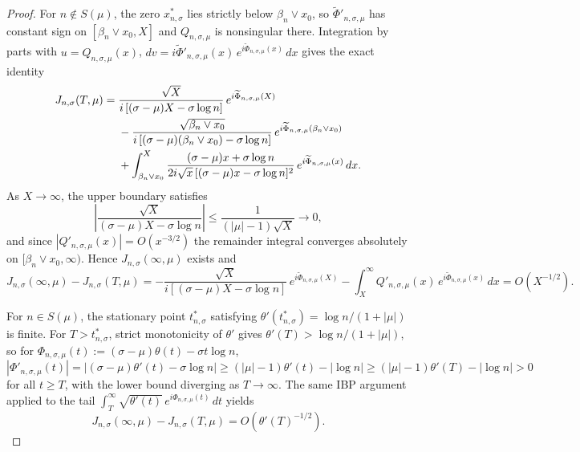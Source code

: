 \documentclass[12pt]{article}
\begin{document}
\begin{proof}
For $n\notin S(\mu)$, the zero $x^{*}_{n,\sigma}$ lies strictly below $\beta_n\vee x_0$, so $\widetilde{\Phi}'_{n,\sigma,\mu}$ has constant sign on $[\beta_n\vee x_0,X]$ and $Q_{n,\sigma,\mu}$ is nonsingular there. Integration by parts with $u=Q_{n,\sigma,\mu}(x)$, $dv=i\widetilde{\Phi}'_{n,\sigma,\mu}(x)\,e^{i\widetilde{\Phi}_{n,\sigma,\mu}(x)}\,dx$ gives the exact identity
\begin{align}
J_{n,\sigma}(T,\mu) =\;& \frac{\sqrt{X}}{i\,[(\sigma-\mu)X-\sigma\log n]}\,e^{i\widetilde{\Phi}_{n,\sigma,\mu}(X)} \notag\\
&-\frac{\sqrt{\beta_n\vee x_0}}{i\,[(\sigma-\mu)(\beta_n\vee x_0)-\sigma\log n]}\,e^{i\widetilde{\Phi}_{n,\sigma,\mu}(\beta_n\vee x_0)} \notag\\
&+\int_{\beta_n\vee x_0}^{X}\frac{(\sigma-\mu)x+\sigma\log n}{2i\sqrt{x}\,[(\sigma-\mu)x-\sigma\log n]^{2}}\,e^{i\widetilde{\Phi}_{n,\sigma,\mu}(x)}\,dx.
\end{align}
As $X\to\infty$, the upper boundary satisfies
\begin{equation}
\left|\frac{\sqrt{X}}{(\sigma-\mu)X-\sigma\log n}\right| \le \frac{1}{(|\mu|-1)\sqrt{X}} \longrightarrow 0,
\end{equation}
and since $|Q'_{n,\sigma,\mu}(x)|=O(x^{-3/2})$ the remainder integral converges absolutely on $[\beta_n\vee x_0,\infty)$. Hence $J_{n,\sigma}(\infty,\mu)$ exists and
\begin{equation}\label{eq:tail-out}
J_{n,\sigma}(\infty,\mu)-J_{n,\sigma}(T,\mu) = -\frac{\sqrt{X}}{i[(\sigma-\mu)X-\sigma\log n]}\,e^{i\widetilde{\Phi}_{n,\sigma,\mu}(X)} - \int_{X}^{\infty}Q'_{n,\sigma,\mu}(x)\,e^{i\widetilde{\Phi}_{n,\sigma,\mu}(x)}\,dx = O(X^{-1/2}).
\end{equation}

For $n\in S(\mu)$, the stationary point $t^{*}_{n,\sigma}$ satisfying $\theta'(t^{*}_{n,\sigma})=\log n/(1+|\mu|)$ is finite. For $T>t^{*}_{n,\sigma}$, strict monotonicity of $\theta'$ gives $\theta'(T)>\log n/(1+|\mu|)$, so for $\Phi_{n,\sigma,\mu}(t):=(\sigma-\mu)\theta(t)-\sigma t\log n$,
\begin{equation}
|\Phi'_{n,\sigma,\mu}(t)| = |(\sigma-\mu)\theta'(t)-\sigma\log n| \ge (|\mu|-1)\theta'(t) - |\log n| \ge (|\mu|-1)\theta'(T)-|\log n| > 0
\end{equation}
for all $t\ge T$, with the lower bound diverging as $T\to\infty$. The same IBP argument applied to the tail $\int_T^\infty \sqrt{\theta'(t)}\,e^{i\Phi_{n,\sigma,\mu}(t)}\,dt$ yields
\begin{equation}\label{eq:tail-in}
J_{n,\sigma}(\infty,\mu)-J_{n,\sigma}(T,\mu) = O\!\left(\theta'(T)^{-1/2}\right).
\end{equation}


\end{proof}
\end{document}
